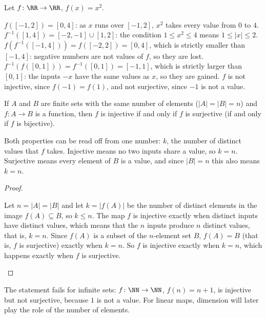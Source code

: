 \documentclass[10pt]{scrartcl}
\begin{document}
\begin{example*}[Image and preimage under $f(x)=x^2$ on $\RR$]
  Let $f\colon\RR\to\RR$, $f(x)=x^2$.
  \begin{itemize}
    \ii $f([-1,2])=[0,4]$: as $x$ runs over $[-1,2]$, $x^2$ takes every value from $0$ to $4$.
    \ii $f^{-1}([1,4])=[-2,-1]\cup[1,2]$: the condition $1\le x^2\le 4$ means $1\le|x|\le2$.
    \ii $f(f^{-1}([-1,4]))=f([-2,2])=[0,4]$, which is strictly smaller than $[-1,4]$: negative numbers are not values of $f$, so they are lost.
    \ii $f^{-1}(f([0,1]))=f^{-1}([0,1])=[-1,1]$, which is strictly larger than $[0,1]$: the inputs $-x$ have the same values as $x$, so they are gained.
    \ii $f$ is not injective, since $f(-1)=f(1)$, and not surjective, since $-1$ is not a value.
  \end{itemize}
\end{example*}

\begin{proposition*}
  If $A$ and $B$ are finite sets with the same number of elements ($|A|=|B|=n$) and $f\colon A\to B$ is a function, then $f$ is injective if and only if $f$ is surjective (if and only if $f$ is bijective).
\end{proposition*}
\begin{ideabox}
  Both properties can be read off from one number: $k$, the number of distinct values that $f$ takes. Injective means no two inputs share a value, so $k=n$. Surjective means every element of $B$ is a value, and since $|B|=n$ this also means $k=n$.
\end{ideabox}
\begin{proof}
  \begin{steps}
    \ii Let $n=|A|=|B|$ and let $k=|f(A)|$ be the number of distinct elements in the image $f(A)\subseteq B$, so $k\le n$.
    \ii The map $f$ is injective exactly when distinct inputs have distinct values, which means that the $n$ inputs produce $n$ distinct values, that is, $k=n$.
    \ii Since $f(A)$ is a subset of the $n$-element set $B$, $f(A)=B$ (that is, $f$ is surjective) exactly when $k=n$. So $f$ is injective exactly when $k=n$, which happens exactly when $f$ is surjective.
  \end{steps}
\end{proof}
The statement fails for infinite sets: $f\colon\NN\to\NN$, $f(n)=n+1$, is injective but not surjective, because $1$ is not a value. For linear maps, dimension will later play the role of the number of elements.
\end{document}
